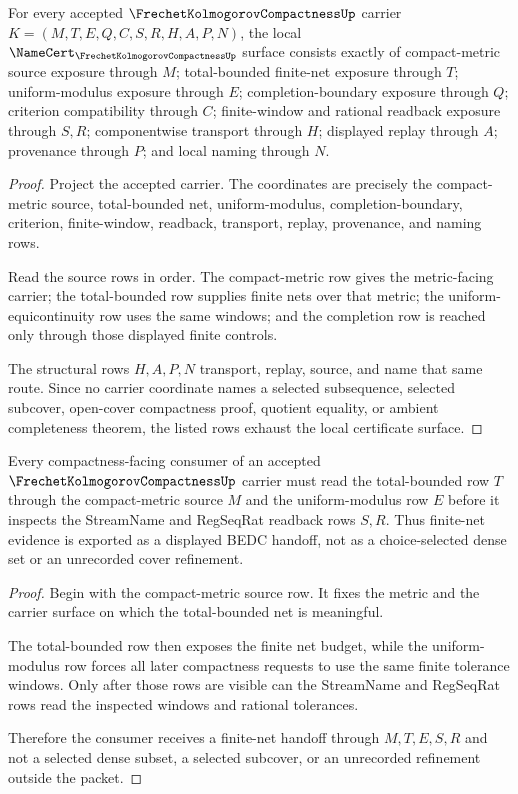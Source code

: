 \begin{theorem}
\label{thm:frechet-kolmogorov-compactness-namecert-obligations}
For every accepted $\FrechetKolmogorovCompactnessUp$ carrier $K=(M,T,E,Q,C,S,R,H,A,P,N)$, the local $\NameCert_{\FrechetKolmogorovCompactnessUp}$ surface consists exactly of compact-metric source exposure through $M$; total-bounded finite-net exposure through $T$; uniform-modulus exposure through $E$; completion-boundary exposure through $Q$; criterion compatibility through $C$; finite-window and rational readback exposure through $S,R$; componentwise transport through $H$; displayed replay through $A$; provenance through $P$; and local naming through $N$.
\end{theorem}
\begin{proof}
Project the accepted carrier. The coordinates are precisely the compact-metric source, total-bounded net, uniform-modulus, completion-boundary, criterion, finite-window, readback, transport, replay, provenance, and naming rows.

Read the source rows in order. The compact-metric row gives the metric-facing carrier; the total-bounded row supplies finite nets over that metric; the uniform-equicontinuity row uses the same windows; and the completion row is reached only through those displayed finite controls.

The structural rows $H,A,P,N$ transport, replay, source, and name that same route. Since no carrier coordinate names a selected subsequence, selected subcover, open-cover compactness proof, quotient equality, or ambient completeness theorem, the listed rows exhaust the local certificate surface.
\end{proof}

\begin{theorem}
\label{thm:frechet-kolmogorov-compactness-total-bounded-handoff}
Every compactness-facing consumer of an accepted $\FrechetKolmogorovCompactnessUp$ carrier must read the total-bounded row $T$ through the compact-metric source $M$ and the uniform-modulus row $E$ before it inspects the StreamName and RegSeqRat readback rows $S,R$. Thus finite-net evidence is exported as a displayed BEDC handoff, not as a choice-selected dense set or an unrecorded cover refinement.
\end{theorem}
\begin{proof}
Begin with the compact-metric source row. It fixes the metric and the carrier surface on which the total-bounded net is meaningful.

The total-bounded row then exposes the finite net budget, while the uniform-modulus row forces all later compactness requests to use the same finite tolerance windows. Only after those rows are visible can the StreamName and RegSeqRat rows read the inspected windows and rational tolerances.

Therefore the consumer receives a finite-net handoff through $M,T,E,S,R$ and not a selected dense subset, a selected subcover, or an unrecorded refinement outside the packet.
\end{proof}

